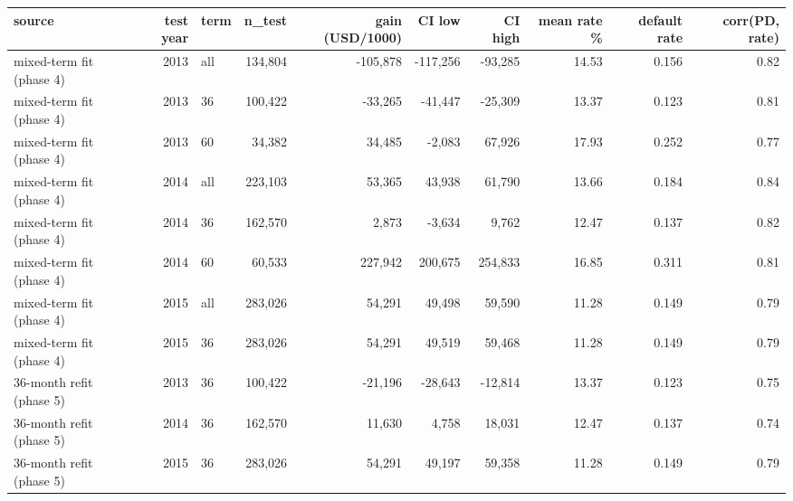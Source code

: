 \begin{tabular}{lrlrrrrrrr}
\toprule
source & test year & term & n\_test & gain (USD/1000) & CI low & CI high & mean rate \% & default rate & corr(PD, rate) \\
\midrule
mixed-term fit (phase 4) & 2013 & all & 134,804 & -105,878 & -117,256 & -93,285 & 14.53 & 0.156 & 0.82 \\
mixed-term fit (phase 4) & 2013 & 36 & 100,422 & -33,265 & -41,447 & -25,309 & 13.37 & 0.123 & 0.81 \\
mixed-term fit (phase 4) & 2013 & 60 & 34,382 & 34,485 & -2,083 & 67,926 & 17.93 & 0.252 & 0.77 \\
mixed-term fit (phase 4) & 2014 & all & 223,103 & 53,365 & 43,938 & 61,790 & 13.66 & 0.184 & 0.84 \\
mixed-term fit (phase 4) & 2014 & 36 & 162,570 & 2,873 & -3,634 & 9,762 & 12.47 & 0.137 & 0.82 \\
mixed-term fit (phase 4) & 2014 & 60 & 60,533 & 227,942 & 200,675 & 254,833 & 16.85 & 0.311 & 0.81 \\
mixed-term fit (phase 4) & 2015 & all & 283,026 & 54,291 & 49,498 & 59,590 & 11.28 & 0.149 & 0.79 \\
mixed-term fit (phase 4) & 2015 & 36 & 283,026 & 54,291 & 49,519 & 59,468 & 11.28 & 0.149 & 0.79 \\
36-month refit (phase 5) & 2013 & 36 & 100,422 & -21,196 & -28,643 & -12,814 & 13.37 & 0.123 & 0.75 \\
36-month refit (phase 5) & 2014 & 36 & 162,570 & 11,630 & 4,758 & 18,031 & 12.47 & 0.137 & 0.74 \\
36-month refit (phase 5) & 2015 & 36 & 283,026 & 54,291 & 49,197 & 59,358 & 11.28 & 0.149 & 0.79 \\
\bottomrule
\end{tabular}
